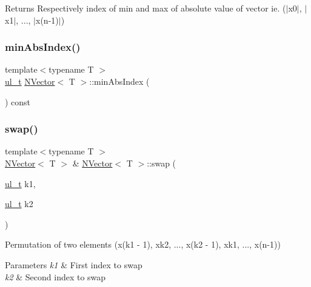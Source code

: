 \begin{DoxyReturn}{Returns}
Respectively index of min and max of absolute value of vector ie. ($\vert$x0$\vert$, $\vert$x1$\vert$, ..., $\vert$x(n-\/1)$\vert$) 
\end{DoxyReturn}
\mbox{\label{class_n_vector_a8b9147431ee1f9c5a25c6e0b2f793c40}} 
\subsubsection{\texorpdfstring{minAbsIndex()}{minAbsIndex()}}
{\footnotesize\ttfamily template$<$typename T $>$ \\
\mbox{\hyperlink{typedef_8h_a1b140a2034db3f5dfe18a987745df43a}{ul\+\_\+t}} \mbox{\hyperlink{class_n_vector}{N\+Vector}}$<$ T $>$\+::min\+Abs\+Index (\begin{DoxyParamCaption}{ }\end{DoxyParamCaption}) const}

\mbox{\label{class_n_vector_a8ea2e2cffa2c3053d835d05a571dac88}} 
\subsubsection{\texorpdfstring{swap()}{swap()}}
{\footnotesize\ttfamily template$<$typename T $>$ \\
\mbox{\hyperlink{class_n_vector}{N\+Vector}}$<$ T $>$ \& \mbox{\hyperlink{class_n_vector}{N\+Vector}}$<$ T $>$\+::swap (\begin{DoxyParamCaption}\item[{\mbox{\hyperlink{typedef_8h_a1b140a2034db3f5dfe18a987745df43a}{ul\+\_\+t}}}]{k1,  }\item[{\mbox{\hyperlink{typedef_8h_a1b140a2034db3f5dfe18a987745df43a}{ul\+\_\+t}}}]{k2 }\end{DoxyParamCaption})}



Permutation of two elements (x(k1 -\/ 1), xk2, ..., x(k2 -\/ 1), xk1, ..., x(n-\/1)) 


\begin{DoxyParams}{Parameters}
{\em k1} & First index to swap \\
\hline
{\em k2} & Second index to swap \\
\hline
\end{DoxyParams}
\mbox{\label{class_n_vector_aabe8585ef2659ce3fa7872c2b96e3b20}} 

